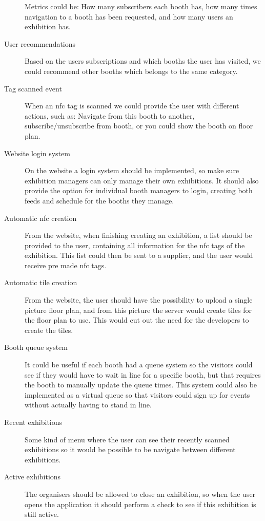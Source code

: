\begin{description}
Metrics could be: How many subscribers each booth has, how many times navigation to a booth has been requested, and how many users an exhibition has.
\item[User recommendations] Based on the users subscriptions and which booths the user has visited, we could recommend other booths which belongs to the same category.
\item[Tag scanned event] When an \ac{nfc} tag is scanned we could provide the user with different actions, such as: Navigate from this booth to another, subscribe/unsubscribe from booth, or you could show the booth on floor plan.
\item[Website login system] On the website a login system should be implemented, so make sure exhibition managers can only manage their own exhibitions. It should also provide the option for individual booth managers to login, creating both feeds and schedule for the booths they manage.
\item[Automatic \ac{nfc} creation] From the website, when finishing creating an exhibition, a list should be provided to the user, containing all information for the \ac{nfc} tags of the exhibition. This list could then be sent to a supplier, and the user would receive pre made \ac{nfc} tags.
\item[Automatic tile creation] From the website, the user should have the possibility to upload a single picture floor plan, and from this picture the server would create tiles for the floor plan to use. This would cut out the need for the developers to create the tiles.
\item[Booth queue system] It could be useful if each booth had a queue system so the visitors could see if they would have to wait in line for a specific booth, but that requires the booth to manually update the queue times. This system could also be implemented as a virtual queue so that visitors could sign up for events without actually having to stand in line.
\item[Recent exhibitions] Some kind of menu where the user can see their recently scanned exhibitions so it would be possible to be navigate between different exhibitions. 
\item[Active exhibitions] The organisers should be allowed to close an exhibition, so when the user opens the application it should perform a check to see if this exhibition is still active.

\end{description}
